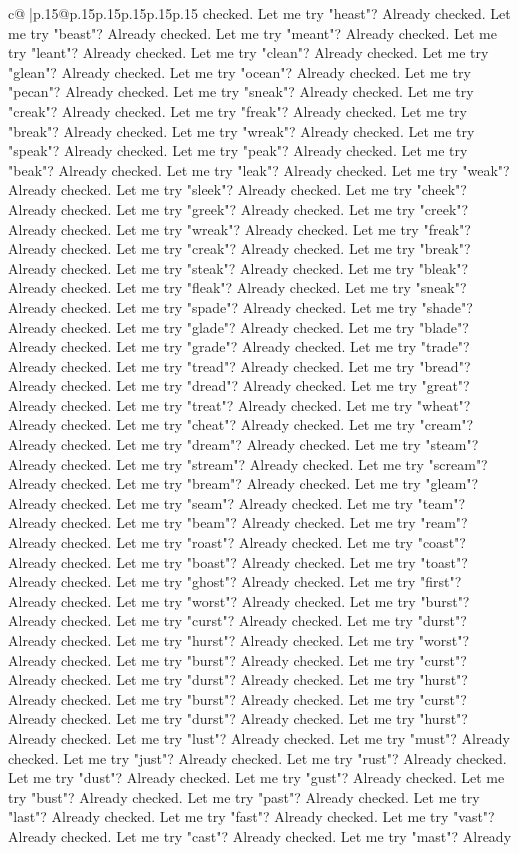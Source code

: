 \documentclass{article}
\begin{document}
{\begin{supertabular}{c@{$\;$}|p{.15\linewidth}@{}p{.15\linewidth}p{.15\linewidth}p{.15\linewidth}p{.15\linewidth}p{.15\linewidth}}
{{{checked. Let me try "heast"? Already checked. Let me try "beast"? Already checked. Let me try "meant"? Already checked. Let me try "leant"? Already checked. Let me try "clean"? Already checked. Let me try "glean"? Already checked. Let me try "ocean"? Already checked. Let me try "pecan"? Already checked. Let me try "sneak"? Already checked. Let me try "creak"? Already checked. Let me try "freak"? Already checked. Let me try "break"? Already checked. Let me try "wreak"? Already checked. Let me try "speak"? Already checked. Let me try "peak"? Already checked. Let me try "beak"? Already checked. Let me try "leak"? Already checked. Let me try "weak"? Already checked. Let me try "sleek"? Already checked. Let me try "cheek"? Already checked. Let me try "greek"? Already checked. Let me try "creek"? Already checked. Let me try "wreak"? Already checked. Let me try "freak"? Already checked. Let me try "creak"? Already checked. Let me try "break"? Already checked. Let me try "steak"? Already checked. Let me try "bleak"? Already checked. Let me try "fleak"? Already checked. Let me try "sneak"? Already checked. Let me try "spade"? Already checked. Let me try "shade"? Already checked. Let me try "glade"? Already checked. Let me try "blade"? Already checked. Let me try "grade"? Already checked. Let me try "trade"? Already checked. Let me try "tread"? Already checked. Let me try "bread"? Already checked. Let me try "dread"? Already checked. Let me try "great"? Already checked. Let me try "treat"? Already checked. Let me try "wheat"? Already checked. Let me try "cheat"? Already checked. Let me try "cream"? Already checked. Let me try "dream"? Already checked. Let me try "steam"? Already checked. Let me try "stream"? Already checked. Let me try "scream"? Already checked. Let me try "bream"? Already checked. Let me try "gleam"? Already checked. Let me try "seam"? Already checked. Let me try "team"? Already checked. Let me try "beam"? Already checked. Let me try "ream"? Already checked. Let me try "roast"? Already checked. Let me try "coast"? Already checked. Let me try "boast"? Already checked. Let me try "toast"? Already checked. Let me try "ghost"? Already checked. Let me try "first"? Already checked. Let me try "worst"? Already checked. Let me try "burst"? Already checked. Let me try "curst"? Already checked. Let me try "durst"? Already checked. Let me try "hurst"? Already checked. Let me try "worst"? Already checked. Let me try "burst"? Already checked. Let me try "curst"? Already checked. Let me try "durst"? Already checked. Let me try "hurst"? Already checked. Let me try "burst"? Already checked. Let me try "curst"? Already checked. Let me try "durst"? Already checked. Let me try "hurst"? Already checked. Let me try "lust"? Already checked. Let me try "must"? Already checked. Let me try "just"? Already checked. Let me try "rust"? Already checked. Let me try "dust"? Already checked. Let me try "gust"? Already checked. Let me try "bust"? Already checked. Let me try "past"? Already checked. Let me try "last"? Already checked. Let me try "fast"? Already checked. Let me try "vast"? Already checked. Let me try "cast"? Already checked. Let me try "mast"? Already }}}
\end{supertabular}}
\end{document}
